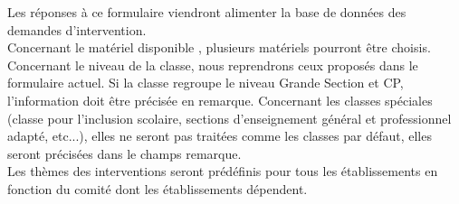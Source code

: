 Les réponses à ce formulaire viendront alimenter la base de données des demandes d'intervention. \\
Concernant le matériel disponible , plusieurs matériels pourront être choisis. \\
Concernant le niveau de la classe, nous reprendrons ceux proposés dans le formulaire actuel. Si la classe regroupe le niveau Grande Section et CP, l'information doit être précisée en remarque.
Concernant les classes spéciales (classe pour l'inclusion scolaire, sections d'enseignement général et professionnel adapté, etc...), elles ne seront pas traitées comme les classes par défaut, elles seront précisées dans le champs remarque.
\\
Les thèmes des interventions seront prédéfinis pour tous les établissements en fonction du comité dont les établissements dépendent.  